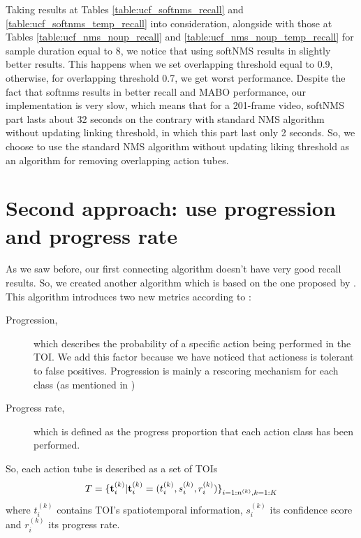 Taking results at Tables \ref{table:ucf_softnms_recall} and \ref{table:ucf_softnms_temp_recall} into consideration, alongside with those
at Tables \ref{table:ucf_nms_noup_recall} and \ref{table:ucf_nms_noup_temp_recall} for sample duration equal to 8, we notice that
using softNMS results in slightly better results. This happens when we set overlapping threshold equal to 0.9, otherwise, for
overlapping threshold 0.7, we get worst performance. Despite the fact that softnms results in better recall and MABO performance,
our implementation is very slow, which means that for a 201-frame video, softNMS part lasts about 32 seconds on the contrary with
standard NMS algorithm without updating linking threshold, in which this part last only 2 seconds. So, we choose to use the standard NMS
algorithm without updating liking threshold as an algorithm for  removing overlapping action tubes.

\section{Second approach: use progression and progress rate}
As we saw before, our first connecting algorithm doesn't have very good recall results. So, we created another algorithm which is based on
the one proposed by \cite{DBLP:journals/corr/abs-1903-00304}. This
algorithm introduces two new metrics according to \cite{DBLP:journals/corr/abs-1903-00304}:

\begin{description}
\item[ Progression,  ] which describes the probability of a specific action being performed in the TOI. 
  We add this factor because we have noticed that actioness is tolerant to false positives. Progression is
  mainly a rescoring mechanism for each class (as mentioned in \cite{DBLP:journals/corr/abs-1903-00304})

\item [ Progress rate, ] which is defined as the progress proportion that each action class has been performed.
  
\end{description}

So, each action tube is described as a set of TOIs
\[  T = {\{ {\bf t}_i^{(k)} | {\bf t}_i^{(k)} = ( t_i^{(k)}, s_i^{(k)}, r_i^{(k)} ) \}}_{i=1:n^{(k)},k=1:K} \]
where $ t_i^{(k)} $ contains TOI's spatiotemporal information, $ s_i^{(k)} $ its confidence score and $ r_i^{(k)} $ its progress rate.

